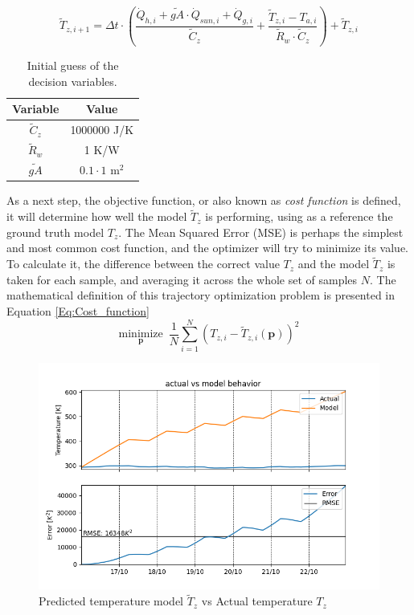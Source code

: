 \begin{equation}
\tilde{T}_{z,i+1} = \Delta t \cdot \left( \frac{\dot{Q}_{h,i} + \tilde{gA} \cdot \dot{Q}_{sun, i} + \dot{Q}_{g,i}}{\tilde{C}_z} + \frac{\tilde{T}_{z,i}-T_{a,i}}{\tilde{R}_w \cdot \tilde{C}_z} \right) + \tilde{T}_{z,i}
\label{eq:finite_difference_model}
\end{equation}


\begin{table}[H]
\centering
\begin{tabular}{c|c}
Variable & Value\\
\hline
\hline
$\tilde{C}_z$ & 1000000 J/K\\
$\tilde{R}_w$ & 1 K/W\\
$\tilde{gA}$ & $0.1\cdot1$ m$^2$ 
\end{tabular}
\caption{Initial guess of the decision variables.}
\label{tab:initial_guess}
\end{table}

As a next step, the objective function, or also known as \emph{cost function} is defined, it will determine how well the model $\tilde{T}_{z}$ is performing, using as a reference the ground truth model $T_{z}$. The Mean Squared Error (MSE) is perhaps the simplest and most common cost function, and the optimizer will try to minimize its value. To calculate it, the difference between the correct value $T_{z}$ and the model $\tilde{T}_{z}$ is taken for each sample, and averaging it across the whole set of samples $N$. The mathematical definition of this trajectory optimization problem is presented in Equation \ref{Eq:Cost_function}
\begin{equation}
\underset{\mathbf{p}}{\text{minimize}}\,\,\,\frac{1}{N}\sum_{i=1}^{N} (T_{z,i}-\tilde{T}_{z,i}(\mathbf{p}))^2 
\label{Eq:Cost_function}
\end{equation}

\begin{figure}[H]
\centering
\includegraphics[scale=0.75]{images/error_actualvsmodel.png}
\caption{Predicted temperature model $\tilde{T}_{z}$ vs Actual temperature $T_z$ }
\label{fig:Model Error}
\end{figure}

